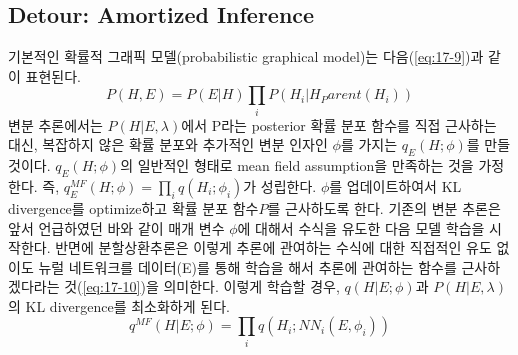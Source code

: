 \documentclass[draft=false]{oblivoir}
\begin{document}
\subsection{Detour: Amortized Inference}
기본적인 확률적 그래픽 모델(probabilistic graphical model)는 다음(\ref{eq:17-9})과 같이 표현된다.
\begin{equation}
	P(H,E) = P(E|H) \prod_i P(H_i|H_Parent(H_i))
	\label{eq:17-9}
\end{equation}
변분 추론에서는 $P(H|E, \lambda)$에서 P라는 posterior 확률 분포 함수를 직접 근사하는 대신, 복잡하지 않은 확률 분포와 추가적인 변분 인자인 $\phi$를 가지는 $q_E(H;\phi)$를 만들 것이다. $q_E(H;\phi)$의 일반적인 형태로 mean field assumption을 만족하는 것을 가정한다. 즉, $q^{MF}_{E}(H; \phi) = \prod_{i} q(H_i;\phi_i)$가 성립한다. $\phi$를 업데이트하여서 KL divergence를 optimize하고 확률 분포 함수$P$를 근사하도록 한다. 기존의 변분 추론은 앞서 언급하였던 바와 같이 매개 변수 $\phi$에 대해서 수식을 유도한 다음 모델 학습을 시작한다. 반면에 분할상환추론은 이렇게 추론에 관여하는 수식에 대한 직접적인 유도 없이도 뉴럴 네트워크를 데이터(E)를 통해 학습을 해서 추론에 관여하는 함수를 근사하겠다라는 것(\ref{eq:17-10})을 의미한다. 이렇게 학습할 경우, $q(H|E;\phi)$과 $P(H|E,\lambda)$의 KL divergence를 최소화하게 된다.
\begin{equation}
	q^{MF}(H|E;\phi) = \prod_i q(H_i; NN_i (E,\phi_i))
	\label{eq:17-10}
\end{equation}
\end{document}
